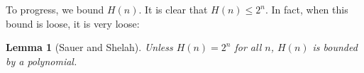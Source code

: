 \documentclass[twocolumn, 11pt]{article}
\newtheorem*{lem}{Lemma}
\theoremstyle{definition}
\begin{document}
        To progress, we bound $H(n)$.  It is clear that $H(n) \leq 2^n$.
        In fact, when this bound is loose, it is very loose:
        \begin{lem}[Sauer and Shelah]
            Unless $H(n) = 2^n$ for all $n$, $H(n)$ is bounded by a polynomial.
        \end{lem}

            \newcommand{\rR}[1]{{\color{moor}#1}}
            \newcommand{\gG}[1]{{\color{moog}#1}}
            \newcommand{\bB}[1]{{\color{moob}#1}}
            \newcommand{\mE}{\texttt{$\square$}}
            \newcommand{\mD}{\texttt{$\blacksquare$}}
            \newcommand{\mA}{\texttt{$\bm{+}$}}
            \newcommand{\mM}{\texttt{$\bm{-}$}}
\end{document}
